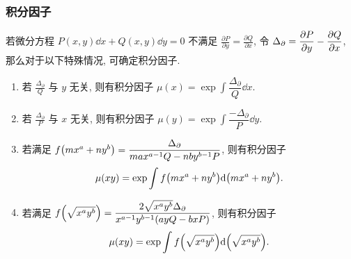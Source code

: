 \subsubsection{积分因子}

\begin{theorem}[积分因子]
    若微分方程 $P(x,y)\dd x+Q(x,y)\dd y=0$ 不满足 $\displaystyle\frac{\partial P}{\partial y}=\frac{\partial Q}{\partial x}$,
    令 $\Delta _\partial=\displaystyle\pdv{P}{y}-\pdv{Q}{x}$, 那么对于以下特殊情况, 可确定积分因子.
    \begin{enumerate}[label=(\arabic{*})]
        \item 若 $\displaystyle\frac{\Delta _\partial}{Q}$ 与 $y$ 无关, 则有积分因子 $\displaystyle\mu(x)=\exp\int\dfrac{\Delta_\partial}{Q}\dd x.$
        \item 若 $\displaystyle\frac{\Delta _\partial}{P}$ 与 $x$ 无关, 则有积分因子 $\displaystyle\mu(y)=\exp\int\dfrac{-\Delta_\partial}{P}\dd y.$
        \item 若满足 $f\qty(mx^a+ny^b)=\dfrac{\Delta _\partial}{max^{a-1}Q-nby^{b-1}P}$, 则有积分因子 $$\mu(xy)=\exp\int f\qty(mx^a+ny^b)\dd \qty(mx^a+ny^b).$$
        \item 若满足 $f\qty(\sqrt{x^ay^b})=\dfrac{2\sqrt{x^ay^b}\Delta_\partial}{x^{a-1}y^{b-1}(ayQ-bxP)}$, 则有积分因子
              $$\mu(xy)=\exp\int f\qty(\sqrt{x^ay^b})\dd \qty(\sqrt{x^ay^b}).$$
    \end{enumerate}
\end{theorem}

